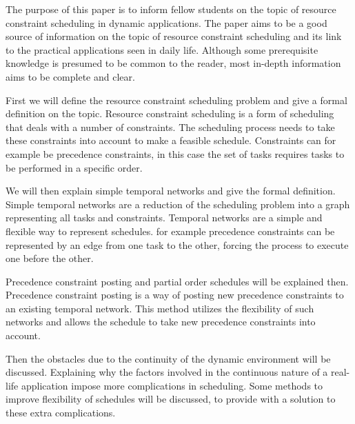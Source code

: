 \documentclass{article}
\begin{document}
The purpose of this paper is to inform fellow students on the topic of resource constraint scheduling in dynamic applications.
The paper aims to be a good source of information on the topic of resource constraint scheduling and its link to the practical applications seen in daily life.
Although some prerequisite knowledge is presumed to be common to the reader, most in-depth information aims to be complete and clear.

First we will define the resource constraint scheduling problem and give a formal definition on the topic.
Resource constraint scheduling is a form of scheduling that deals with a number of constraints.
The scheduling process needs to take these constraints into account to make a feasible schedule.
Constraints can for example be precedence constraints, in this case the set of tasks requires tasks to be performed in a specific order.

We will then explain simple temporal networks and give the formal definition.
Simple temporal networks are a reduction of the scheduling problem into a graph representing all tasks and constraints.
Temporal networks are a simple and flexible way to represent schedules.
for example precedence constraints can be represented by an edge from one task to the other, forcing the process to execute one before the other.

Precedence constraint posting and partial order schedules will be explained then.
Precedence constraint posting is a way of posting new precedence constraints to an existing temporal network.
This method utilizes the flexibility of such networks and allows the schedule to take new precedence constraints into account.

Then the obstacles due to the continuity of the dynamic environment will be discussed.
Explaining why the factors involved in the continuous nature of a real-life application impose more complications in scheduling.
Some methods to improve flexibility of schedules will be discussed, to provide with a solution to these extra complications.
\end{document}

